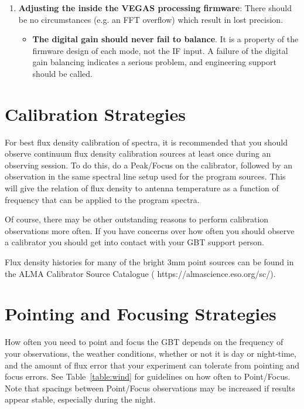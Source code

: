 \begin{enumerate}[label=\bfseries{\arabic*.},leftmargin=*,
labelindent=\parindent]
\item {\bf Adjusting the  inside the \gls{VEGAS} processing
firmware}: There should be no circumstances (e.g. an FFT overflow) which result
in lost precision.
\begin{itemize}[leftmargin=*]
\item {\bf The digital gain should never fail to balance}. It is a property
of the firmware design of each mode, not the \gls{IF} input.  A failure
of the digital gain balancing indicates a serious problem, and engineering
support should be called.
\end{itemize}

\end{enumerate}


\section{Calibration Strategies}

For best flux density calibration of spectra, it is recommended that you should
observe continuum flux density calibration sources at least once during an
observing session. To do this, do a Peak/Focus on the calibrator, followed
by an observation in the same spectral line setup used for the program sources.
This will give the relation of flux density to antenna temperature as a function
of frequency that can be applied to the program spectra.

Of course, there may be other outstanding reasons to perform calibration
observations more often.  If you have concerns over how often you should observe
a calibrator you should get into contact with your \gls{GBT} support person.

Flux density histories for many of the bright 3mm point sources can be found
in the ALMA Calibrator Source Catalogue
(
{https://almascience.eso.org/sc/}).

\newpage

\section{Pointing and Focusing Strategies}\label{sec:pointfocus}

How often you need to point and focus the \gls{GBT} depends on the frequency
of your observations, the weather conditions, whether or not it is day
or night-time, and the amount of flux error that your experiment can
tolerate from pointing and focus errors.  See Table~\ref{table:wind} for guidelines
on how often to Point/Focus.  Note that spacings between Point/Focus observations may
be increased if results appear stable, especially during the night.

